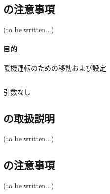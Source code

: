 \subsection{\KIncutBoring の注意事項\TBW}
(to be written...)



\clearpage

\paragraph*{目的}
暖機運転のための移動および設定


\subsection{\OwarmingupAArguments}
引数なし


\subsection{\OwarmingupA の取扱説明\TBW}
(to be written...)


\subsection{\OwarmingupA の注意事項\TBW}
(to be written...)



\clearpage

